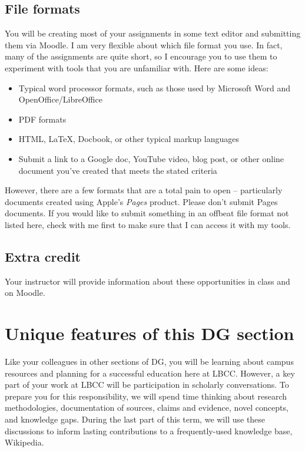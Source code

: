 \documentclass[12pt,article,oneside]{memoir}
\begin{document}
\subsection{File formats}
You will be creating most of your assignments in some text editor and submitting them via Moodle.  I am very flexible about which file format you use. In fact, many of the assignments are quite short, so I encourage you to use them to experiment with tools that you are unfamiliar with.  Here are some ideas:
\begin{itemize}
 \item Typical word processor formats, such as those used by Microsoft Word and OpenOffice/LibreOffice
 \item PDF formats
 \item HTML, \LaTeX, Docbook, or other typical markup languages
 \item Submit a link to a Google doc, YouTube video, blog post, or other online document you've created that meets the stated criteria 
\end{itemize}



However, there are a few formats that are a total pain to open -- particularly documents created using Apple's \emph{Pages} product.  Please don't submit Pages documents. If you would like to submit something in an offbeat file format not listed here, check with me first to make sure that I can access it with my tools.


  
\subsection{Extra credit}
Your instructor will provide information about these opportunities in class and on Moodle.

\section{Unique features of this DG section}
Like your colleagues in other sections of DG, you will be learning about campus resources and planning for a successful education here at LBCC.  However, a key part of your work at LBCC will be participation in scholarly conversations.  To prepare you for this responsibility, we will spend time thinking about research methodologies, documentation of sources, claims and evidence, novel concepts, and knowledge gaps.  During the last part of this term, we will use these discussions to inform lasting contributions to a frequently-used knowledge base, Wikipedia.
\end{document}
